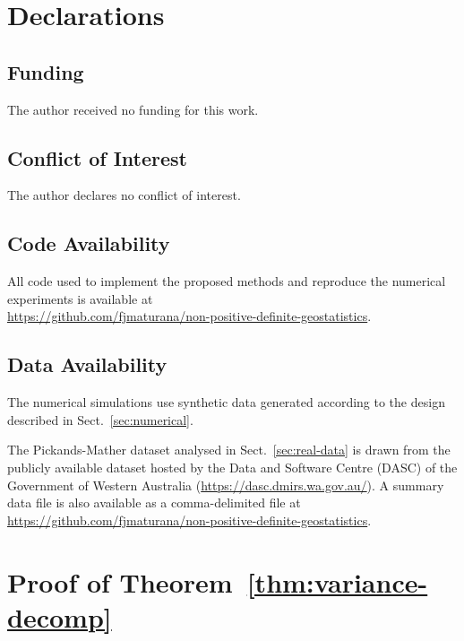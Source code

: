 \documentclass[smallextended]{svjour3}
\newcommand{\1}{\mathbf{1}}
\begin{document}
\section*{Declarations}

 


\subsection*{Funding}
The author received no funding for this work.

\subsection*{Conflict of Interest}
The author declares no conflict of interest.

\subsection*{Code Availability}
All code used to implement the proposed methods and reproduce the numerical experiments is available at\\
\url{https://github.com/fjmaturana/non-positive-definite-geostatistics}.

\subsection*{Data Availability}
The numerical simulations use synthetic data generated according to the design described in Sect.~\ref{sec:numerical}. 

The Pickands-Mather dataset analysed in Sect.~\ref{sec:real-data} is drawn from the publicly available dataset hosted by the Data and Software Centre (DASC) of the Government of Western Australia (\url{https://dasc.dmirs.wa.gov.au/}). A summary data file is also available as a comma-delimited file at\\ \url{https://github.com/fjmaturana/non-positive-definite-geostatistics}.







\appendix
\renewcommand{\thesection}{Appendix~\Alph{section}}		
\clearpage
	
\section{Proof of Theorem~\ref{thm:variance-decomp}}
\label{app:variance-decomp-proof}
\end{document}
